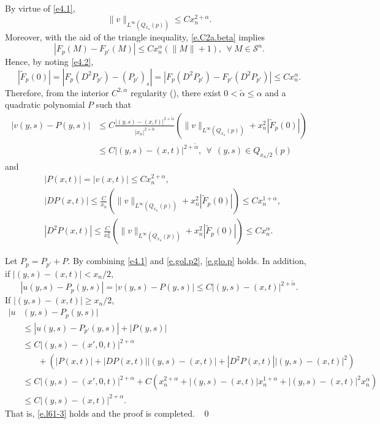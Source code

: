 \documentclass[preprint,12pt]{elsarticle}
\theoremstyle{definition}
\theoremstyle{remark}
\numberwithin{equation}{section}
\begin{document}
By virtue of \cref{e4.1},
\begin{equation*}
\|v\|_{L^{\infty}(Q_{x_n}(p))}\leq Cx_n^{2+\alpha}.
\end{equation*}
Moreover, with the aid of the triangle inequality, \cref{e.C2a.beta} implies
\begin{equation*}
|F_{p}(M)-F_{p'}(M)|\leq Cx_n^{\alpha}(\|M\|+1),~~\forall ~M\in \mathcal{S}^n.
\end{equation*}
Hence, by noting \cref{e4.2},
\begin{equation*}
|\tilde{F}_{p}(0)|=|F_{p}(D^2P_{p'})-(P_{p'})_s|= |F_{p}(D^2P_{p'})-F_{p'}(D^2P_{p'})|
\leq Cx_n^{\alpha}.
\end{equation*}
Therefore, from the interior $C^{2,\alpha}$ regularity (\cite[Theorem 1.1, Theorem 4.13]{MR1139064}), there exist $0<\tilde \alpha\leq \alpha$ and a quadratic polynomial $P$ such that
\begin{equation*}
  \begin{aligned}
|v(y,s)-P(y,s)|&\leq C\frac{|(y,s)-(x,t)|^{2+\tilde \alpha}}{|x_n|^{2+\tilde \alpha}}
\left(\|v\|_{L^{\infty}(Q_{x_n}(p))}+x_n^2|\tilde{F}_{p}(0)|\right)\\
  &\leq C |(y,s)-(x,t)|^{2+\tilde \alpha},~~\forall~~(y,s)\in Q_{x_n/2}(p)
  \end{aligned}
\end{equation*}
and
\begin{equation}\label{e.gol.p2}
  \begin{aligned}
&|P(x,t)|=|v(x,t)|\leq  Cx_n^{2+\alpha},\\
&|D P(x,t)|\leq \frac{C}{x_n}
\left(\|v\|_{L^{\infty}(Q_{x_n}(p))}+x_n^2|\tilde{F}_{p}(0)|\right)\leq Cx_n^{1+\alpha},\\
&|D^2P(x,t)|\leq \frac{C}{x_n^2}
\left(\|v\|_{L^{\infty}(Q_{x_n}(p))}+x_n^2|\tilde{F}_{p}(0)|\right)\leq Cx_n^{\alpha}.
  \end{aligned}
\end{equation}

Let $P_p=P_{p'}+P$. By combining \cref{e4.1} and \cref{e.gol.p2}, \cref{e.glo.p} holds. In addition, if $|(y,s)-(x,t)|<x_n/2$,
\begin{equation*}
  |u(y,s)-P_p(y,s)|=|v(y,s)-P(y,s)|\leq C|(y,s)-(x,t)|^{2+\tilde \alpha}.
\end{equation*}
If $|(y,s)-(x,t)|\geq x_n/2$,
\begin{equation*}
  \begin{aligned}
    |u&(y,s)-P_p(y,s)|\\
    &\leq |u(y,s)-P_{p'}(y,s)|+|P(y,s)|\\
    &\leq C|(y,s)-(x',0,t)|^{2+\alpha}\\
    &~~~~~~~~+ \left(|P(x,t)|+|DP(x,t)||(y,s)-(x,t)|
    +|D^2P(x,t)||(y,s)-(x,t)|^2\right)\\
    &\leq C|(y,s)-(x',0,t)|^{2+\alpha}+ C(x_n^{2+\alpha}+|(y,s)-(x,t)|x_n^{1+\alpha}+|(y,s)-(x,t)|^2x_n^{\alpha})\\
    &\leq  C|(y,s)-(x,t)|^{2+\alpha}.
  \end{aligned}
\end{equation*}
That is, \cref{e.l61-3} holds and the proof is completed. ~\qed \\
\end{document}
